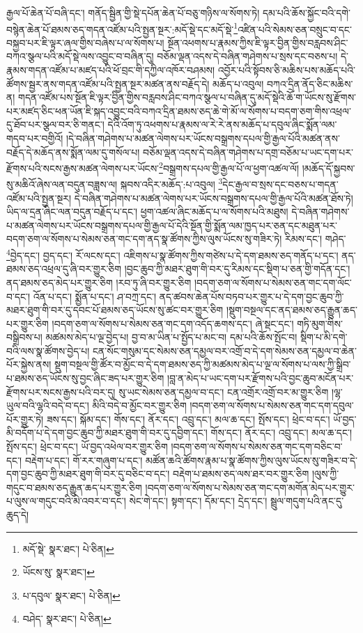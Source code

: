 རྒྱལ་པོ་ཆེན་པོ་བཞི་དང་། གནོད་སྦྱིན་གྱི་སྡེ་དཔོན་ཆེན་པོ་བཅུ་གཉིས་ལ་སོགས་ཏེ། དམ་པའི་ཆོས་སྐྱོང་བའི་དགེ་བསྙེན་ཆེན་པོ་ཐམས་ཅད་གདན་འཛོམ་པའི་སྤྱན་སྔར་:མདོ་སྡེ་དང་མདོ་སྡེ་\footnote{མདོ་སྡེ་  སྣར་ཐང་།  པེ་ཅིན། }འཛིན་པའི་སེམས་ཅན་བསྲུང་བ་དང་བསྐྱབ་པར་ཇི་ལྟར་ཞལ་གྱིས་བཞེས་པ་ལ་སོགས་པ། སྔོན་འཕགས་པ་རྣམས་ཀྱིས་ཇི་ལྟར་བྱིན་གྱིས་བརླབས་ཤིང་བཀའ་སྩལ་པའི་མདོ་སྡེ་ལས་འབྱུང་བ་བཞིན་དུ། བཅོམ་ལྡན་འདས་དེ་བཞིན་གཤེགས་པ་སྲས་དང་བཅས་པ། དེ་རྣམས་གདན་འཛོམ་པ་མཛད་པའི་ཕོ་བྲང་གི་དཀྱིལ་འཁོར་བཤམས། འབྱོར་པའི་སྟོབས་ཅི་མཆིས་པས་མཆོད་པའི་ཚོགས་སྦྱར་ནས་གདན་འཛོམ་པའི་སྤྱན་སྔར་མཚན་ནས་བརྗོད་དེ། མཆོད་པ་འབུལ། བཀའ་དྲིན་ནོད་ཅིང་མཆིས་ན། གདན་འཛོམ་པས་སྔོན་ཇི་ལྟར་བྱིན་གྱིས་བརླབས་ཤིང་བཀའ་སྩལ་པ་བཞིན་དུ་མདོ་སྡེའི་ཆོ་ག་ཡོངས་སུ་རྫོགས་པར་མཛད་ཅིང་ཕན་ཡོན་ཇི་སྐད་འབྱུང་བའི་བཀའ་དྲིན་ཐམས་ཅད་ཆེ་གེ་མོ་ལ་སོགས་པ་བདག་ཅག་གིས་འཕྲལ་དུ་ཐོབ་པར་སྩལ་བར་ཅི་གནང་། དེའི་འོག་ཏུ་འཕགས་པ་རྣམས་ལ་རེ་རེ་ནས་མཆོད་པ་དབུལ་ཞིང་སྨོན་ལམ་གདབ་པར་བགྱིའོ། །དེ་བཞིན་གཤེགས་པ་མཚན་ལེགས་པར་ཡོངས་བསྒྲགས་དཔལ་གྱི་རྒྱལ་པོའི་མཚན་ནས་བརྗོད་དེ་མཆོད་ནས་སྨོན་ལམ་དུ་གསོལ་པ། བཅོམ་ལྡན་འདས་དེ་བཞིན་གཤེགས་པ་དགྲ་བཅོམ་པ་ཡང་དག་པར་རྫོགས་པའི་སངས་རྒྱས་མཚན་ལེགས་པར་ཡོངས་\footnote{ཡོངས་སུ་  སྣར་ཐང་། }བསྒྲགས་དཔལ་གྱི་རྒྱལ་པོ་ལ་ཕྱག་འཚལ་ལོ། །མཆོད་དོ་སྐྱབས་སུ་མཆིའོ་ཞེས་ལན་བདུན་བཟླས་ལ། སྐབས་འདིར་མཆོད་:པ་འབུལ། \footnote{པ་དབུལ་  སྣར་ཐང་།  པེ་ཅིན། }དེང་རྒྱལ་བ་སྲས་དང་བཅས་པ་གདན་འཛོམ་པའི་སྤྱན་སྔར། དེ་བཞིན་གཤེགས་པ་མཚན་ལེགས་པར་ཡོངས་བསྒྲགས་དཔལ་གྱི་རྒྱལ་པོའི་མཚན་ཐོས་ཏེ། ཡིད་ལ་དྲན་ཞིང་ལན་བདུན་བརྗོད་པ་དང་། ཕྱག་འཚལ་ཞིང་མཆོད་པ་ལ་སོགས་པའི་མཐུས། དེ་བཞིན་གཤེགས་པ་མཚན་ལེགས་པར་ཡོངས་བསྒྲགས་དཔལ་གྱི་རྒྱལ་པོ་དེའི་སྔོན་གྱི་སྨོན་ལམ་ཁྱད་པར་ཅན་དང་མཐུན་པར་བདག་ཅག་ལ་སོགས་པ་སེམས་ཅན་གང་དག་ནད་སྣ་ཚོགས་ཀྱིས་ལུས་ཡོངས་སུ་གཟིར་ཏེ། རིམས་དང་། གཤེད་\footnote{བཤེད་  སྣར་ཐང་།  པེ་ཅིན། }བྱེད་དང་། བྱད་དང་། རོ་ལངས་དང་། འཇིགས་པ་སྣ་ཚོགས་ཀྱིས་གཙེས་པ་དེ་དག་ཐམས་ཅད་གནོད་པ་དང་། ནད་ཐམས་ཅད་འཕྲལ་དུ་ཞི་བར་གྱུར་ཅིག །བྱང་ཆུབ་ཀྱི་མཐར་ཐུག་གི་བར་དུ་རིམས་དང་སྡིག་པ་ཅན་གྱི་གདོན་དང་། ནད་ཐམས་ཅད་མེད་པར་གྱུར་ཅིག །རབ་ཏུ་ཞི་བར་གྱུར་ཅིག །བདག་ཅག་ལ་སོགས་པ་སེམས་ཅན་གང་དག་ལོང་བ་དང་། འོན་པ་དང་། སྨྱོན་པ་དང་། ཤ་བཀྲ་དང་། ནད་ཚབས་ཆེན་པོས་བཏབ་པར་གྱུར་པ་དེ་དག་བྱང་ཆུབ་ཀྱི་མཐར་ཐུག་གི་བར་དུ་དབང་པོ་ཐམས་ཅད་ཡོངས་སུ་ཚང་བར་གྱུར་ཅིག །སྡུག་བསྔལ་དང་ནད་ཐམས་ཅད་རྒྱུན་ཆད་པར་གྱུར་ཅིག །བདག་ཅག་ལ་སོགས་པ་སེམས་ཅན་གང་དག་འདོད་ཆགས་དང་། ཞེ་སྡང་དང་། གཏི་མུག་གིས་བསྒྲིབས་པ། མཚམས་མེད་པ་ལྔ་བྱེད་པ། བྱ་བ་མ་ཡིན་པ་སྤྱོད་པ་མང་བ། དམ་པའི་ཆོས་སྤོང་བ། སྡིག་པ་མི་དགེ་བའི་ལས་སྣ་ཚོགས་བྱེད་པ། ངན་སོང་གསུམ་དང་སེམས་ཅན་དམྱལ་བར་འགྲོ་བ་དེ་དག་སེམས་ཅན་དམྱལ་བ་ཆེན་པོར་སྐྱེས་ནས། སྡུག་བསྔལ་གྱི་ཚོར་བ་མྱོང་བ་དེ་དག་ཐམས་ཅད་ཀྱི་མཚམས་མེད་པ་ལྔ་ལ་སོགས་པ་ལས་ཀྱི་སྒྲིབ་པ་ཐམས་ཅད་ཡོངས་སུ་བྱང་ཞིང་ཟད་པར་གྱུར་ཅིག །བླ་ན་མེད་པ་ཡང་དག་པར་རྫོགས་པའི་བྱང་ཆུབ་མངོན་པར་རྫོགས་པར་སངས་རྒྱས་པའི་བར་དུ། སུ་ཡང་སེམས་ཅན་དམྱལ་བ་དང་། ངན་འགྲོར་འགྲོ་བར་མ་གྱུར་ཅིག །ལྷ་ཡུལ་བའི་ལྷའི་བདེ་བ་དང་། མིའི་བདེ་བ་མྱོང་བར་གྱུར་ཅིག །བདག་ཅག་ལ་སོགས་པ་སེམས་ཅན་གང་དག་དབུལ་པོར་གྱུར་ཏེ། ཟས་དང་། སྐོམ་དང་། གོས་དང་། ནོར་དང་། འབྲུ་དང་། མལ་ཆ་དང་། སྤོས་དང་། ཕྲེང་བ་དང་། ཡོ་བྱད་མི་བདོག་པ་དེ་དག་བྱང་ཆུབ་ཀྱི་མཐར་ཐུག་གི་བར་དུ་དབྱིག་དང་། གོས་དང་། ནོར་དང་། འབྲུ་དང་། མལ་ཆ་དང་། སྤོས་དང་། ཕྲེང་བ་དང་། ཡོ་བྱད་འཕེལ་བར་གྱུར་ཅིག །བདག་ཅག་ལ་སོགས་པ་སེམས་ཅན་གང་དག་བཅིང་བ་དང་། བརྡེག་པ་དང་། གོ་རར་གཞུག་པ་དང་། མཚོན་ཆའི་ཚོགས་རྣམ་པ་སྣ་ཚོགས་ཀྱིས་ལུས་ཡོངས་སུ་གཟིར་བ་དེ་དག་བྱང་ཆུབ་ཀྱི་མཐར་ཐུག་གི་བར་དུ་བཅིང་བ་དང་། བརྡེག་པ་ཐམས་ཅད་ལས་ཐར་བར་གྱུར་ཅིག །ལུས་ཀྱི་གདུང་བ་ཐམས་ཅད་རྒྱུན་ཆད་པར་གྱུར་ཅིག །བདག་ཅག་ལ་སོགས་པ་སེམས་ཅན་གང་དག་མགོན་མེད་པར་གྱུར་པ་ལུས་ལ་གདུང་བའི་མེ་འབར་བ་དང་། སེང་གེ་དང་། སྟག་དང་། དོམ་དང་། དྲེད་དང་། སྦྲུལ་གདུག་པའི་ནང་དུ་ཆུད་དེ། 